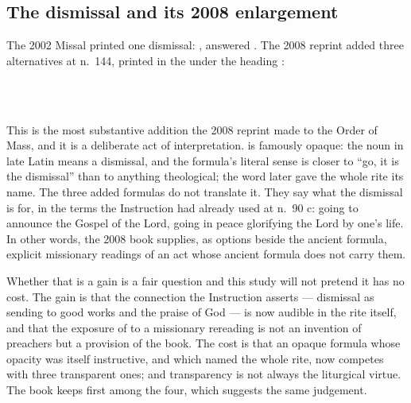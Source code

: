 \subsection{The dismissal and its 2008 enlargement}

The 2002 Missal printed one dismissal: , answered . The
2008 reprint added three alternatives at n.\ 144, printed in the  under the
heading :


\begin{studyframe}
\\
\\
\end{studyframe}

This is the most substantive addition the 2008 reprint made to the Order of Mass, and it is a
deliberate act of interpretation.  is famously opaque: the noun
 in late Latin means a dismissal, and the formula's literal sense is closer to ``go,
it is the dismissal'' than to anything theological; the word later gave the whole rite its name.
The three added formulas do not translate it. They say what the dismissal is for, in the terms
the Instruction had already used at n.\ 90 c: going to announce the Gospel of the Lord, going in
peace glorifying the Lord by one's life. In other words, the 2008 book supplies, as options
beside the ancient formula, explicit missionary readings of an act whose ancient formula does not
carry them.

Whether that is a gain is a fair question and this study will not pretend it has no cost. The
gain is that the connection the Instruction asserts --- dismissal as sending to good works and
the praise of God --- is now audible in the rite itself, and that the exposure of  to a missionary rereading is not an invention of preachers but a provision of the book. The
cost is that an opaque formula whose opacity was itself instructive, and which named the whole
rite, now competes with three transparent ones; and transparency is not always the liturgical
virtue. The book keeps  first among the four, which suggests the same
judgement.

